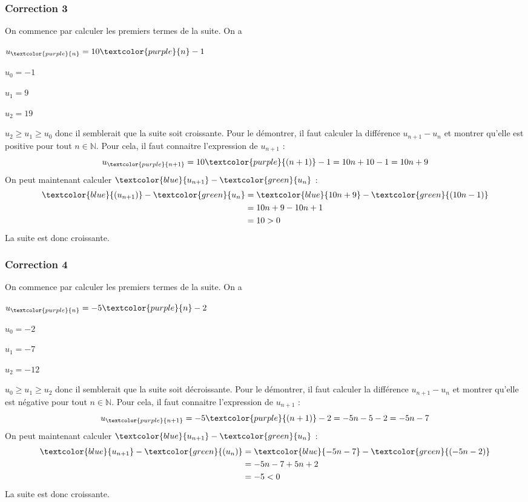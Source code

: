 \documentclass[15pt, mathserif]{beamer}
\newcommand{\N}{\mathbb{N}}			%
\begin{document}
\begin{frame}
\vspace{-10mm}
	\frametitle{Correction 3}
 \vspace*{1cm} 
 On commence par calculer les premiers termes de la suite. On a 
 \begin{multicols}{4} 
 $u_{\textcolor{purple}{n}}=10\textcolor{purple}{n}-1$ 
 
  \columnbreak 
 
  $u_0=-1$ 
 
  \columnbreak 
 
 $u_1=9$ 
 
 \columnbreak 
 
 $u_2=19$ 
  \end{multicols} $u_2 \geqslant u_1 \geqslant u_0$ donc il semblerait que la suite soit croissante. Pour le démontrer, il faut calculer la différence $u_{n+1} -u_n$ et montrer qu'elle est positive pour tout $n \in \N$. Pour cela, il faut connaitre l'expression de $u_{n+1}$ : $$u_{\textcolor{purple}{n+1}} = 10\textcolor{purple}{(n+1)}-1=10n+10-1=10n+9$$ On peut maintenant calculer $\textcolor{blue}{u_{n+1}}-\textcolor{green}{u_n} $ : \begin{align*} \textcolor{blue}{(u_{n+1})}-\textcolor{green}{u_n} &=\textcolor{blue}{10n+9}-\textcolor{green}{(10n-1)} \\ 
 &= 10n+9-10n+1\\ 
 &= 10 >0 
 \end{align*} 
 La suite est donc croissante. \end{frame}


\begin{frame}
\vspace{-10mm}
	\frametitle{Correction 4}
 \vspace*{1cm} 
 On commence par calculer les premiers termes de la suite. On a 
 \begin{multicols}{4} 
 $u_{\textcolor{purple}{n}}=-5\textcolor{purple}{n}-2$ 
 
  \columnbreak 
 
  $u_0=-2$ 
 
  \columnbreak 
 
 $u_1=-7$ 
 
 \columnbreak 
 
 $u_2=-12$ 
  \end{multicols} $u_0 \geqslant u_1 \geqslant u_2$ donc il semblerait que la suite soit décroissante. Pour le démontrer, il faut calculer la différence $u_{n+1} -u_n$ et montrer qu'elle est négative pour tout $n \in \N$. Pour cela, il faut connaitre l'expression de $u_{n+1}$ : $$u_{\textcolor{purple}{n+1}} = -5\textcolor{purple}{(n+1)}-2=-5n-5-2=-5n-7$$ On peut maintenant calculer $\textcolor{blue}{u_{n+1}}-\textcolor{green}{u_n} $ : \begin{align*} \textcolor{blue}{u_{n+1}}-\textcolor{green}{(u_n)} &=\textcolor{blue}{-5n-7}-\textcolor{green}{(-5n-2)} \\ 
 &= -5n-7+5n+2\\ 
 &= -5 <0 
 \end{align*} 
 La suite est donc croissante.\end{frame}
\end{document}
